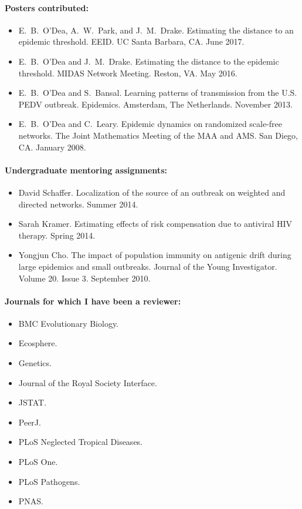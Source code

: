 \documentclass[a4paper]{article}
\begin{document}
\paragraph{Posters contributed:}
\begin{itemize}
  \item[~] E.\ B.\ O'Dea, A.\ W.\ Park, and J.\ M.\ Drake. Estimating the distance to
    an epidemic threshold. EEID. UC Santa Barbara, CA. June  2017.
  \item[~] E.\ B.\ O'Dea and J.\ M.\ Drake. Estimating the distance to
    the epidemic threshold. MIDAS Network Meeting.  Reston,
    VA. May 2016.
  \item[~] E.\ B.\ O'Dea and S.\ Bansal. Learning patterns of
    transmission from the U.S. PEDV outbreak. Epidemics.
    Amsterdam, The Netherlands. November 2013.
  \item[~] E.\ B.\ O'Dea and C.\ Leary. Epidemic dynamics on
    randomized scale-free networks.  The Joint Mathematics Meeting
    of the MAA and AMS. San Diego, CA. January 2008.
\end{itemize}

\paragraph{Undergraduate mentoring assignments:}

\begin{itemize}
  \item[~] David Schaffer. Localization of the source of an outbreak
    on weighted and directed networks. Summer 2014.
  \item[~] Sarah Kramer. Estimating effects of risk compensation due
    to antiviral HIV therapy. Spring 2014.
  \item[~] Yongjun Cho. The impact of population immunity on antigenic
    drift during large epidemics and small outbreaks. Journal of the
    Young Investigator. Volume 20. Issue 3. September 2010.
\end{itemize}

\paragraph{Journals for which I have been a reviewer:}
\begin{itemize}
  \item[~] BMC Evolutionary Biology.
  \item[~] Ecosphere.
  \item[~] Genetics.
  \item[~] Journal of the Royal Society Interface.
  \item[~] JSTAT.
  \item[~] PeerJ.
  \item[~] PLoS Neglected Tropical Diseases.
  \item[~] PLoS One.
  \item[~] PLoS Pathogens.
  \item[~] PNAS.
\end{itemize}
\end{document}
